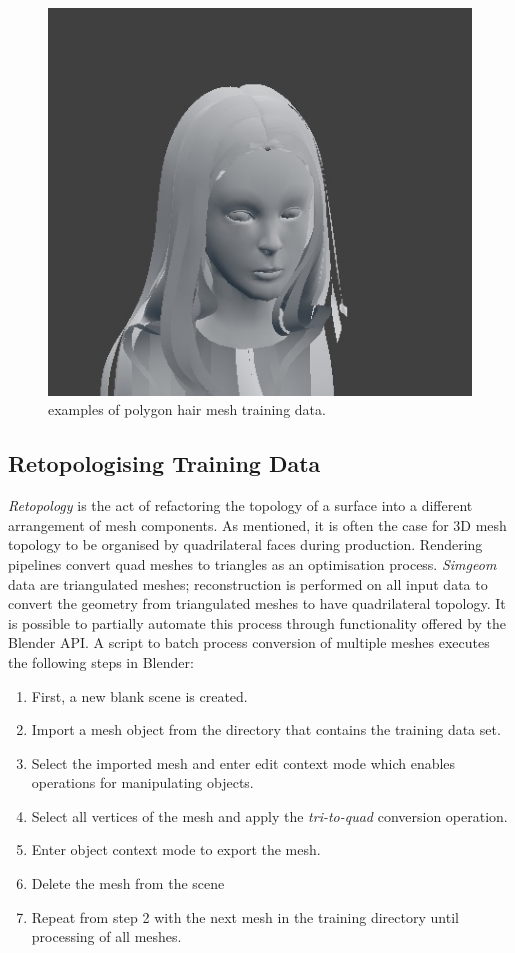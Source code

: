 \documentclass[ %
author={Dillon Keith Diep},
supervisor={Dr. Carl Henrik Ek},
degree={MEng},
title={ART-CG:},
subtitle={Assisted Real-time Content Generation of 3D Hair by Learning Manifolds},
type={Research},
year={2017} ]{dissertation}
\begin{document}
\begin{figure}[!h]
	\includegraphics[scale=2]{images/inputHair4}
	\caption{examples of polygon hair mesh training data.}
	\label{inputHairs}
\end{figure}

\subsection{Retopologising Training Data}
\textit{Retopology} is the act of refactoring the topology of a surface into a different arrangement of mesh components. As mentioned, it is often the case for 3D mesh topology to be organised by quadrilateral faces during production. Rendering pipelines convert quad meshes to triangles as an optimisation process. \textit{Simgeom} data are triangulated meshes; reconstruction is performed on all input data to convert the geometry from triangulated meshes to have quadrilateral topology. It is possible to partially automate this process through functionality offered by the Blender API. A script to batch process conversion of multiple meshes executes the following steps in Blender:
\begin{enumerate}
	\item First, a new blank scene is created.
	\item Import a mesh object from the directory that contains the training data set.
	\item Select the imported mesh and enter edit context mode which enables operations for manipulating objects.
	\item Select all vertices of the mesh and apply the \textit{tri-to-quad} conversion operation.
	\item Enter object context mode to export the mesh.
	\item Delete the mesh from the scene
	\item Repeat from step 2 with the next mesh in the training directory until processing of all meshes.
\end{enumerate}
\end{document}

